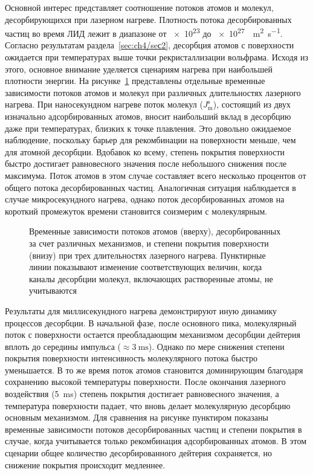 Основной интерес представляет соотношение потоков атомов и молекул, десорбирующихся при лазерном нагреве. Плотность потока десорбированных частиц во время ЛИД лежит в диапазоне от \num{e23} до \SI{e27}{\per\meter\squared\per\second}. Согласно результатам раздела~\cref{sec:ch4/seс2}, десорбция атомов с поверхности ожидается при температурах выше точки рекристаллизации вольфрама. Исходя из этого, основное внимание уделяется сценариям нагрева при наибольшей плотности энергии. На рисунке~\cref{fig:ch4/LID_fluxes} представлены отдельные временные зависимости потоков атомов и молекул при различных длительностях лазерного нагрева. При наносекундном нагреве поток молекул ($J_\mathrm{m}^\mathrm{s}$), состоящий из двух изначально адсорбированных атомов, вносит наибольший вклад в десорбцию даже при температурах, близких к точке плавления. Это довольно ожидаемое наблюдение, поскольку барьер для рекомбинации на поверхности меньше, чем для атомной десорбции. Вдобавок ко всему, степень покрытия поверхности быстро достигает равновесного значения после небольшого снижения после максимума. Поток атомов в этом случае составляет всего несколько процентов от общего потока десорбированных частиц. Аналогичная ситуация наблюдается в случае микросекундного нагрева, однако поток десорбированных атомов на короткий промежуток времени становится соизмерим с молекулярным.

\begin{figure}[ht]
    \caption{Временные зависимости потоков атомов (вверху), десорбированных за счет различных механизмов, и степени покрытия поверхности (внизу) при трех длительностях лазерного нагрева. Пунктирные линии показывают изменение соответствующих величин, когда каналы десорбции молекул, включающих растворенные атомы, не учитываются}\label{fig:ch4/LID_fluxes}
\end{figure}

Результаты для миллисекундного нагрева демонстрируют иную динамику процессов десорбции. В начальной фазе, после основного пика, молекулярный поток с поверхности остается преобладающим механизмом десорбции дейтерия вплоть до середины импульса (\( \approx \SI{3}{\milli\second} \)). Однако по мере снижения степени покрытия поверхности интенсивность молекулярного потока быстро уменьшается. В то же время поток атомов становится доминирующим благодаря сохранению высокой температуры поверхности. После окончания лазерного воздействия (\SI{5}{\milli\second}) степень покрытия достигает равновесного значения, а температура поверхности падает, что вновь делает молекулярную десорбцию основным механизмом. Для сравнения на рисунке пунктиром показаны временные зависимости потоков десорбированных частиц и степени покрытия в случае, когда учитывается только рекомбинация адсорбированных атомов. В этом сценарии общее количество десорбированного дейтерия сохраняется, но снижение покрытия происходит медленнее.

